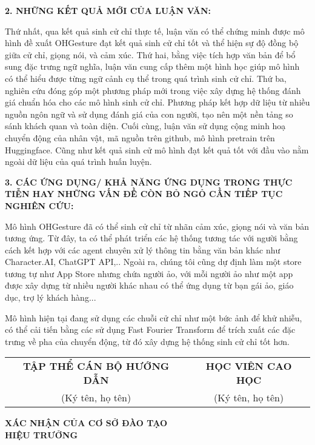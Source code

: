 \vspace{5pt}
{\MakeUppercase \Large \bfseries 2. NHỮNG KẾT QUẢ MỚI CỦA LUẬN VĂN:}


Thứ nhất, qua kết quả sinh cử chỉ thực tế, luận văn có thể chứng minh được mô hình đề xuất OHGesture đạt kết quả sinh cử chỉ tốt và thể hiện sự độ đồng bộ giữa cử chỉ, giọng nói, và cảm xúc.
Thứ hai, bằng việc tích hợp văn bản để bổ sung đặc trưng ngữ nghĩa, luận văn cung cấp thêm một hình học giúp mô hình có thể hiểu được từng ngữ cảnh cụ thể trong quá trình sinh cử chỉ.
Thứ ba, nghiên cứu đóng góp một phương pháp mới trong việc xây dựng hệ thống đánh giá chuẩn hóa cho các mô hình sinh cử chỉ. Phương pháp kết hợp dữ liệu từ nhiều nguồn ngôn ngữ và sử dụng đánh giá của con người, tạo nên một nền tảng so sánh khách quan và toàn diện.
Cuối cùng, luận văn sử dụng cộng minh hoạ chuyển động của nhân vật, mã nguồn trên github, mô hình pretrain trên Huggingface. Cũng như kết quả sinh cử mô hình đạt kết quả tốt với đầu vào nằm ngoài dữ liệu của quá trình huấn luyện.

\vspace{5pt}
{\MakeUppercase \Large \bfseries 3. CÁC ỨNG DỤNG/ KHẢ NĂNG ỨNG DỤNG TRONG THỰC TIỄN HAY NHỮNG VẤN ĐỀ CÒN BỎ NGỎ CẦN TIẾP TỤC NGHIÊN CỨU:}


Mô hình OHGesture đã có thể sinh cử chỉ từ nhãn cảm xúc, giọng nói và văn bản tương ứng.
Từ đây, ta có thể phát triển các hệ thống tương tác với người bằng cách kết hợp với các agent chuyên xử lý thông tin bằng văn bản khác như Character.AI, ChatGPT API,.. Ngoài ra, chúng tôi cũng dự định làm một store tương tự như App Store nhưng chứa người ảo, với mỗi người ảo như một app được xây dựng từ nhiều người khác nhau có thể ứng dụng từ bạn gái ảo, giáo dục, trợ lý khách hàng...

Mô hình hiện tại đang sử dụng các chuỗi cử chỉ như một bức ảnh để khử nhiễu, có thể cải tiến bằng các sử dụng Fast Fourier Transform để trích xuất các đặc trưng về pha của chuyển động, từ đó xây dựng hệ thống sinh cử chỉ tốt hơn.


\begin{center}
    \begin{tabular}{c c}
        \textbf{TẬP THỂ CÁN BỘ HƯỚNG DẪN} & \textbf{HỌC VIÊN CAO HỌC} \\
        (Ký tên, họ tên) & (Ký tên, họ tên) \\
    \end{tabular}
    
    \vspace{3cm} %
    
    \textbf{XÁC NHẬN CỦA CƠ SỞ ĐÀO TẠO} \\
    \textbf{HIỆU TRƯỞNG}
\end{center}
